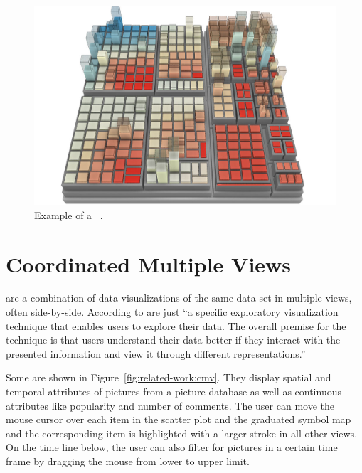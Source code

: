 \begin{figure}
  \centering
  \includegraphics[width=\textwidth]{figures/related-work/2_5D_treemap_example}
  \caption{Example of a \tmap{}~\parencite{Doellner2017}.}
  \label{fig:research:ua_treemap}
\end{figure}

\section{Coordinated Multiple Views}\label{sec:related-work:cmvs}
\cmvs{} are a combination of data visualizations of the same data set in multiple views, often side-by-side.
According to \textcite{Roberts2007} \cmvs{} are just ``a specific exploratory visualization technique that enables users to explore their data.
The overall premise for the technique is that users understand their data better if they interact with the presented information and view it through different representations.''~\parencite{Roberts2007}

Some \cmvs{} are shown in Figure~\ref{fig:related-work:cmv}.
They display spatial and temporal attributes of pictures from a picture database as well as continuous attributes like popularity and number of comments.
The user can move the mouse cursor over each item in the scatter plot and the graduated symbol map and the corresponding item is highlighted with a larger stroke in all other views.
On the time line below, the user can also filter for pictures in a certain time frame by dragging the mouse from lower to upper limit.

